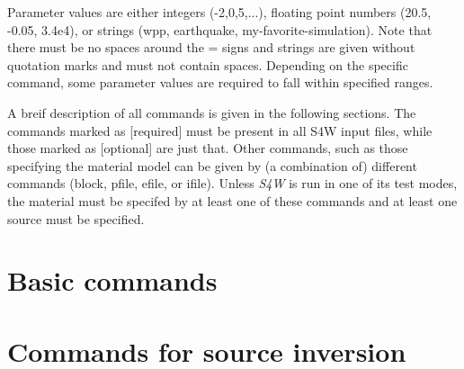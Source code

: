 \documentclass[11pt]{report}
\begin{document}
Parameter values are either integers (-2,0,5,...), floating point numbers (20.5, -0.05, 3.4e4), or strings
(wpp, earthquake, my-favorite-simulation). Note that there must be no spaces around the = signs and
strings are given without quotation marks and must not contain spaces. Depending on the specific
command, some parameter values are required to fall within specified ranges.

A breif description of all commands is given in the following sections. The commands marked as
[required] must be present in all S4W input files, while those marked as [optional] are just
that. Other commands, such as those specifying the material model can be given by (a combination of)
different commands (block, pfile, efile, or ifile). Unless \emph{S4W} is run in one of its test
modes, the material must be specifed by at least one of these commands and at least one source must
be specified.

\section{Basic commands}

\section{Commands for source inversion}
\end{document}
